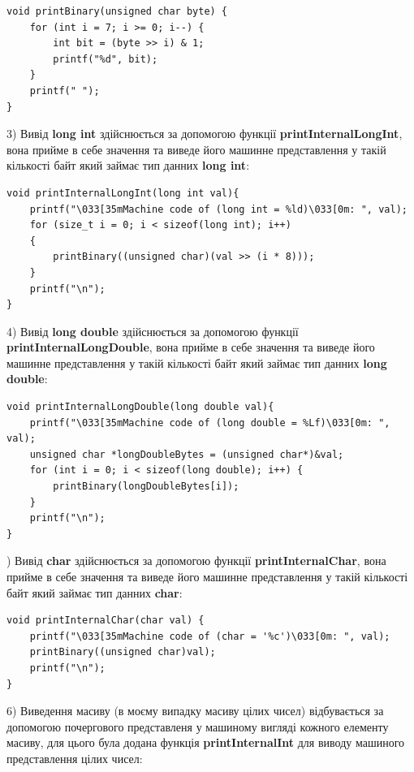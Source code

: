 \begin{lstlisting}[style=customc]
void printBinary(unsigned char byte) {
    for (int i = 7; i >= 0; i--) {
        int bit = (byte >> i) & 1;
        printf("%d", bit);
    }
    printf(" ");
}
\end{lstlisting}

3) Вивід \textbf{long int} здійснюється за допомогою функції \textbf{printInternalLongInt}, вона прийме в себе значення та виведе його машинне представлення у такій кількості байт який займає тип данних \textbf{long int}:

\begin{lstlisting}[style=customc]
void printInternalLongInt(long int val){
    printf("\033[35mMachine code of (long int = %ld)\033[0m: ", val);
    for (size_t i = 0; i < sizeof(long int); i++)
    {
        printBinary((unsigned char)(val >> (i * 8)));
    }
    printf("\n");
}
\end{lstlisting}

4) Вивід \textbf{long double} здійснюється за допомогою функції \textbf{printInternalLongDouble}, вона прийме в себе значення та виведе його машинне представлення у такій кількості байт який займає тип данних \textbf{long double}:

\begin{lstlisting}[style=customc]
void printInternalLongDouble(long double val){
    printf("\033[35mMachine code of (long double = %Lf)\033[0m: ", val);
    unsigned char *longDoubleBytes = (unsigned char*)&val;
    for (int i = 0; i < sizeof(long double); i++) {
        printBinary(longDoubleBytes[i]); 
    }
    printf("\n");
}
\end{lstlisting}

) Вивід \textbf{char} здійснюється за допомогою функції \textbf{printInternalChar}, вона прийме в себе значення та виведе його машинне представлення у такій кількості байт який займає тип данних \textbf{char}:

\begin{lstlisting}[style=customc]
void printInternalChar(char val) {
    printf("\033[35mMachine code of (char = '%c')\033[0m: ", val);
    printBinary((unsigned char)val);
    printf("\n");
}
\end{lstlisting}


6) Виведення масиву (в моєму випадку масиву цілих чисел) відбувається за допомогою почергового представленя у машиному вигляді кожного елементу масиву, для цього була додана функція \textbf{printInternalInt} для виводу машиного представлення цілих чисел:

